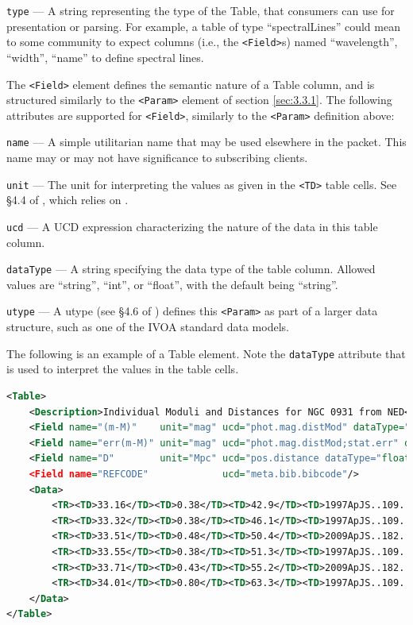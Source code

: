 \documentclass[11pt,a4paper]{ivoa}
\begin{document}
 {\tt type}\label{sec:3.3.3.2} --- A string representing the type of the Table, that consumers can use for presentation or parsing. For example, a table of type ``spectralLines'' could mean to some community to expect columns (i.e., the {\tt <Field>}s) named ``wavelength'', ``width'', ``name'' to define spectral lines. 

The {\tt <Field>} element defines the semantic nature of a Table column, and is structured similarly to the {\tt <Param>} element of section \ref{sec:3.3.1}. The following attributes are supported for {\tt <Field>}, similarly to the {\tt <Param>} definition above: 

 {\tt name}\label{sec:3.3.3.3} --- A simple utilitarian name that may be used elsewhere in the packet. This name may or may not have significance to subscribing clients. 

 {\tt unit}\label{sec:3.3.3.4} --- The unit for interpreting the values as given in the {\tt <TD>} table cells. See \S4.4 of \citep{2019ivoa.spec.1021O}, which relies on \citep{2014ivoa.spec.0523D}. 

 {\tt ucd}\label{sec:3.3.3.5} --- A UCD \citep{2018ivoa.spec.0527M}
expression characterizing the nature of the data in this table column. 

 {\tt dataType}\label{sec:3.3.3.6} --- A string specifying the data type of the table column. Allowed values are ``string'', ``int'', or ``float'', with the default being ``string''.
 
 {\tt utype}\label{sec:3.3.3.7} --- A utype (see \S4.6 of \citep{2019ivoa.spec.1021O}) defines this {\tt <Param>} as part of a larger data structure, such as one of the IVOA standard data models. 
 
 The following is an example of a Table element. Note the {\tt dataType} attribute that is used to interpret the values in the table cells. 
\begin{lstlisting}[language=XML]
<Table>
    <Description>Individual Moduli and Distances for NGC 0931 from NED</Description>
    <Field name="(m-M)"    unit="mag" ucd="phot.mag.distMod" dataType="float"/>
    <Field name="err(m-M)" unit="mag" ucd="phot.mag.distMod;stat.err" dataType="float"/>
    <Field name="D"        unit="Mpc" ucd="pos.distance dataType="float"/>
    <Field name="REFCODE"             ucd="meta.bib.bibcode"/>
    <Data>
        <TR><TD>33.16</TD><TD>0.38</TD><TD>42.9</TD><TD>1997ApJS..109..333W</TD></TR>
        <TR><TD>33.32</TD><TD>0.38</TD><TD>46.1</TD><TD>1997ApJS..109..333W</TD></TR>
        <TR><TD>33.51</TD><TD>0.48</TD><TD>50.4</TD><TD>2009ApJS..182..474S</TD></TR>
        <TR><TD>33.55</TD><TD>0.38</TD><TD>51.3</TD><TD>1997ApJS..109..333W</TD></TR>
        <TR><TD>33.71</TD><TD>0.43</TD><TD>55.2</TD><TD>2009ApJS..182..474S</TD></TR>
        <TR><TD>34.01</TD><TD>0.80</TD><TD>63.3</TD><TD>1997ApJS..109..333W</TD></TR>
    </Data>
</Table> 
\end{lstlisting}
\end{document}
